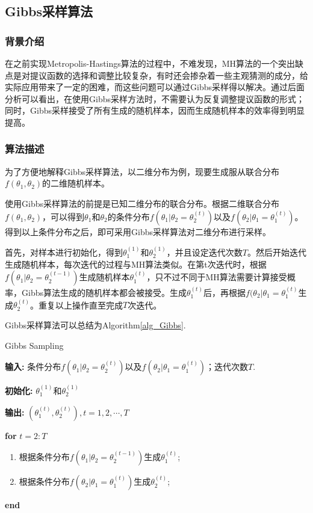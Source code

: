 \documentclass[11pt]{article}
\begin{document}
\subsection{Gibbs采样算法}
\subsubsection{背景介绍}
在之前实现Metropolis-Hastings算法的过程中，不难发现，MH算法的一个突出缺点是对提议函数的选择和调整比较复杂，有时还会掺杂着一些主观猜测的成分，给实际应用带来了一定的困难，而这些问题可以通过Gibbs采样得以解决。通过后面分析可以看出，在使用Gibbs采样方法时，不需要认为反复调整提议函数的形式；同时，Gibbs采样接受了所有生成的随机样本，因而生成随机样本的效率得到明显提高\cite{Jun}。

\subsubsection{算法描述}
为了方便地解释Gibbs采样算法，以二维分布为例，现要生成服从联合分布$f(\theta_{1},\theta_{2})$的二维随机样本。

使用Gibbs采样算法的前提是已知二维分布的联合分布。根据二维联合分布$f(\theta_{1},\theta_{2})$，可以得到$\theta_{1}$和$\theta_{2}$的条件分布$f(\theta_{1}\vert\theta_{2}=\theta_{2}^{(t)})$以及$f(\theta_{2}\vert\theta_{1}=\theta_{1}^{(t)})$。得到以上条件分布之后，即可采用Gibbs采样算法对二维分布进行采样。

首先，对样本进行初始化，得到$\theta_{1}^{(1)}$和$\theta_{2}^{(1)}$，并且设定迭代次数$T$。然后开始迭代生成随机样本，每次迭代的过程与MH算法类似。在第t次迭代时，根据$f(\theta_{1}\vert\theta_{2}=\theta_{2}^{(t-1)})$生成随机样本$\theta_{1}^{(t)}$，只不过不同于MH算法需要计算接受概率，Gibbs算法生成的随机样本都会被接受。生成$\theta_{1}^{(t)}$后，再根据$f(\theta_{2}\vert\theta_{1}=\theta_{1}^{(t)}$生成$\theta_{2}^{(t)}$。重复以上操作直至完成$T$次迭代。

Gibbs采样算法可以总结为Algorithm\ref{alg_Gibbs}.

\begin{algorithm}[t]
\caption{Gibbs Sampling} 
\textbf{输入:} 条件分布$f(\theta_{1}\vert\theta_{2}=\theta_{2}^{(t)})$以及$f(\theta_{2}\vert\theta_{1}=\theta_{1}^{(t)})$；迭代次数$T$.

\textbf{初始化:} $\theta_{1}^{(1)}$和$\theta_{2}^{(1)}$

\textbf{输出:} $(\theta_{1}^{(t)},\theta_{2}^{(t)}),t=1,2,\cdots,T$

\textbf{for} $t=2:T$ 
\begin{enumerate} 
  \item 根据条件分布$f(\theta_{1}\vert\theta_{2}=\theta_{2}^{(t-1)})$生成$\theta_{1}^{(t)}$;
  
  \item 根据条件分布$f(\theta_{2}\vert\theta_{1}=\theta_{1}^{(t)})$生成$\theta_{2}^{(t)}$;
\end{enumerate} 
\textbf{end} 
\label{alg_Gibbs} 
\end{algorithm}
\end{document}
